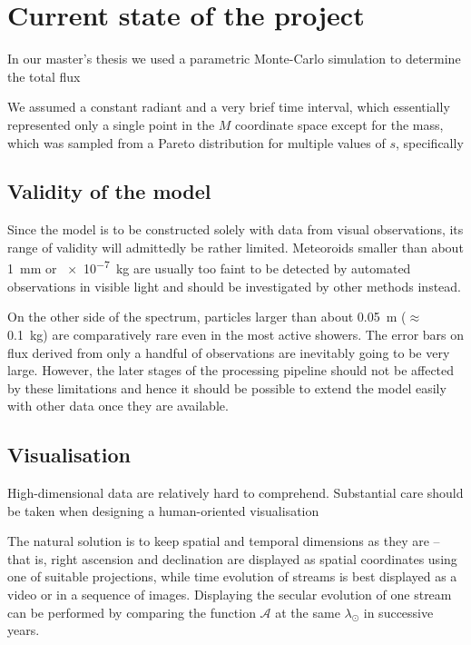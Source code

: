 \section{Current state of the project} \label{pc}
    In our master's thesis \citep{balaz-thesis} we used a parametric Monte-Carlo simulation
    to determine the total flux 

    We assumed a constant radiant and a very brief time interval,
    which essentially represented only a single point in the $M$ coordinate space
    except for the mass, which was sampled from a Pareto distribution for multiple values of $s$,
    specifically


    \subsection{Validity of the model} \label{iav}
        Since the model is to be constructed solely with data from visual observations,
        its range of validity will admittedly be rather limited.
        Meteoroids smaller than about \SI{1}{\milli\metre} or \SI{e-7}{\kilo\gram} are usually too faint
        to be detected by automated observations in visible light and should be investigated
        by other methods instead.

        On the other side of the spectrum, particles larger than about \SI{0.05}{\metre} ($\approx$ \SI{0.1}{\kilo\gram})
        are comparatively rare even in the most active showers.
        The error bars on flux derived from only a handful of observations are inevitably going to be very large.
        However, the later stages of the processing pipeline should not be affected by these limitations
        and hence it should be possible to extend the model easily with other data once they are available.

    \subsection{Visualisation} \label{iov}
        High-dimensional data are relatively hard to comprehend. Substantial care should be taken when designing
        a human-oriented visualisation

        The natural solution is to keep spatial and temporal dimensions as they are -- that is,
        right ascension and declination are displayed as spatial coordinates using one of suitable projections,
        while time evolution of streams is best displayed as a video or in a sequence of images.
        Displaying the secular evolution of one stream can be performed by comparing the function $\mathcal{A}$ at
        the same $\lambda_\odot$ in successive years.

